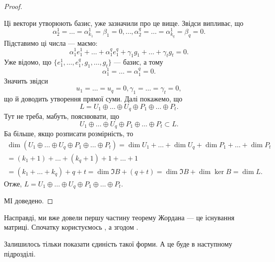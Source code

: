 \documentclass{math_library}
\begin{document}
\begin{proof}
\begin{enumerate}[nosep,wide=0pt,label={\Roman*.}]
\[\]
Ці вектори утворюють базис, уже зазначили про це вище. Звідси випливає, що
\[
\alpha_2^1=\dots=\alpha_{k_1}^1 = \beta_1 = 0, \dots, \alpha_2^q=\dots=\alpha_{k_q}^1 = \beta_q = 0.
\]
Підставимо ці числа --- маємо:
\[
\alpha_1^1e_1^1 + \dots + \alpha_1^qe_1^q + \gamma_1 g_1 + \dots + \gamma_t g_t = 0.
\]
Уже відомо, що $\{e_1^1,\dots,e_1^q, g_1,\dots,g_t\}$ --- базис, а тому 
\[
\alpha_1^1 = \dots = \alpha_1^q = 0.
\]
Значить звідси 
\[
u_1 = \dots = u_q = 0, \gamma_1 = \dots = \gamma_t = 0,
\]
що й доводить утворення прямої суми. Далі покажемо, що 
\[
L = U_1 \oplus \dots \oplus U_q \oplus P_1 \oplus \dots \oplus P_t.
\]
Тут не треба, мабуть, пояснювати, що
\[
U_1 \oplus \dots \oplus U_q \oplus P_1 \oplus \dots \oplus P_t \subset L.
\]
Ба більше, якщо розписати розмірність, то
\begin{align*}
\dim (U_1 \oplus \dots \oplus U_q \oplus P_1 \oplus \dots \oplus P_t) = \dim U_1 + \dots + \dim U_q + \dim P_1 + \dots + \dim P_t \\
= (k_1+1) + \dots + (k_q+1) + 1 + \dots + 1 \\
= (k_1+\dots+k_q) + q + t = \dim \Im B + (q+t) = \dim \Im B + \dim \ker B = \dim L.
\end{align*}
Отже, $L = U_1 \oplus \dots \oplus U_q \oplus P_1 \oplus \dots \oplus P_t$.
\end{enumerate}
МІ доведено.
\end{proof}

\begin{remark}
Насправді, ми вже довели першу частину теорему Жордана --- це існування матриці. Спочатку користуємось , а згодом .
\end{remark}

Залишилось тільки показати єдиність такої форми. А це буде в наступному підрозділі.
\end{document}

